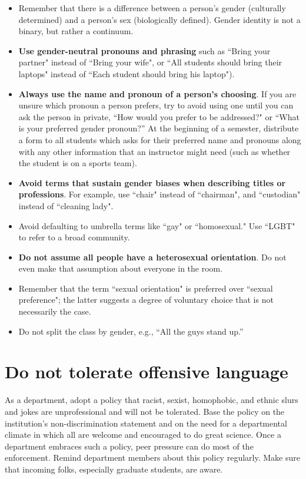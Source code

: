 \begin{itemize}
	\item Remember that there is a difference between a person's gender (culturally determined) and a person's sex (biologically defined). Gender identity is not a binary, but rather a continuum.
	\item \textbf{Use gender-neutral pronouns and phrasing} such as ``Bring your partner" instead of ``Bring your wife", or ``All students should bring their laptops" instead of ``Each student should bring his laptop").
	\item \textbf{Always use the name and pronoun of a person's choosing}. If you are unsure which pronoun a person prefers, try to avoid using one until you can ask the person in private, ``How would you prefer to be addressed?" or ``What is your preferred gender pronoun?''  At the beginning of a semester, distribute a form to all students which asks for their preferred name and pronouns along with any other information that an instructor might need (such as whether the student is on a sports team).
	\item \textbf{Avoid terms that sustain gender biases when describing titles or professions}. For example, use ``chair" instead of ``chairman", and ``custodian" instead of ``cleaning lady".
	\item Avoid defaulting to umbrella terms like ``gay" or ``homosexual." Use ``LGBT" to refer to a broad community.
	\item \textbf{Do not assume all people have a heterosexual orientation}.  Do not even make that assumption about everyone in the room.
	\item Remember that the term ``sexual orientation" is preferred over ``sexual preference"; the latter suggests a degree of voluntary choice that is not necessarily the case.
	\item Do not split the class by gender, e.g., ``All the guys stand up.''
\end{itemize}


\section {Do not tolerate offensive language}
\label{offensive-language}
As a department, adopt a policy that racist, sexist, homophobic, and ethnic slurs and jokes are unprofessional and will not be tolerated.  Base the policy on the institution's non-discrimination statement and on the need for a departmental climate in which all are welcome and encouraged to do great science.  Once a department embraces such a policy, peer pressure can do most of the enforcement.  Remind department members about this policy regularly.  Make sure that incoming folks, especially graduate students, are aware.


